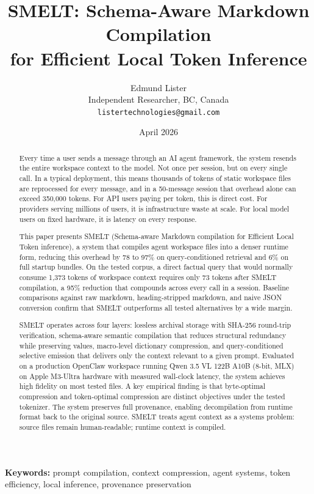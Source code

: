 \documentclass[11pt,a4paper]{article}
\title{SMELT: Schema-Aware Markdown Compilation\\for Efficient Local Token Inference}
\author{
    Edmund Lister\\
    Independent Researcher, BC, Canada\\
    \texttt{listertechnologies@gmail.com}
}
\date{April 2026}
\begin{document}
\maketitle

\begin{abstract}
Every time a user sends a message through an AI agent framework, the system resends the entire workspace context to the model. Not once per session, but on every single call. In a typical deployment, this means thousands of tokens of static workspace files are reprocessed for every message, and in a 50-message session that overhead alone can exceed 350,000 tokens. For API users paying per token, this is direct cost. For providers serving millions of users, it is infrastructure waste at scale. For local model users on fixed hardware, it is latency on every response.

This paper presents SMELT (Schema-aware Markdown compilation for Efficient Local Token inference), a system that compiles agent workspace files into a denser runtime form, reducing this overhead by 78 to 97\% on query-conditioned retrieval and 6\% on full startup bundles. On the tested corpus, a direct factual query that would normally consume 1,373 tokens of workspace context requires only 73 tokens after SMELT compilation, a 95\% reduction that compounds across every call in a session. Baseline comparisons against raw markdown, heading-stripped markdown, and naive JSON conversion confirm that SMELT outperforms all tested alternatives by a wide margin.

SMELT operates across four layers: lossless archival storage with SHA-256 round-trip verification, schema-aware semantic compilation that reduces structural redundancy while preserving values, macro-level dictionary compression, and query-conditioned selective emission that delivers only the context relevant to a given prompt. Evaluated on a production OpenClaw workspace running Qwen 3.5 VL 122B A10B (8-bit, MLX) on Apple M3-Ultra hardware with measured wall-clock latency, the system achieves high fidelity on most tested files. A key empirical finding is that byte-optimal compression and token-optimal compression are distinct objectives under the tested tokenizer. The system preserves full provenance, enabling decompilation from runtime format back to the original source. SMELT treats agent context as a systems problem: source files remain human-readable; runtime context is compiled.
\end{abstract}

\noindent\textbf{Keywords:} prompt compilation, context compression, agent systems, token efficiency, local inference, provenance preservation
\end{document}
